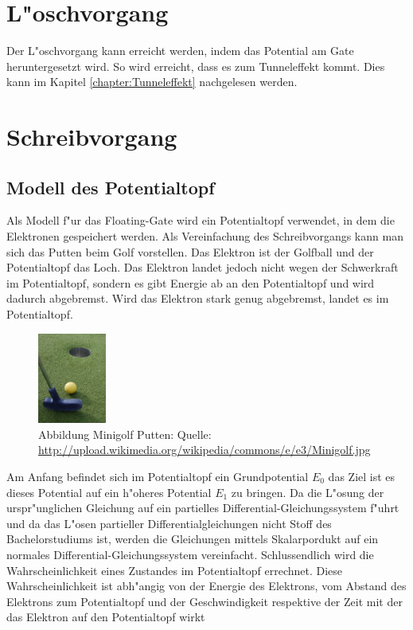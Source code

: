\begin{refsection}
\section{L"oschvorgang}
Der L"oschvorgang kann erreicht werden, indem das Potential am Gate
heruntergesetzt wird. So wird erreicht, dass es zum Tunneleffekt
kommt. Dies kann im Kapitel \ref{chapter:Tunneleffekt} nachgelesen werden.


\section{Schreibvorgang}

\subsection{Modell des Potentialtopf}
Als Modell f"ur das Floating-Gate wird ein Potentialtopf verwendet,
in dem die Elektronen gespeichert werden.
Als Vereinfachung des Schreibvorgangs kann man sich das Putten beim
Golf vorstellen. Das Elektron ist der Golfball und der Potentialtopf
das Loch. Das Elektron landet jedoch nicht wegen der Schwerkraft im
Potentialtopf, sondern es gibt Energie ab an den Potentialtopf und wird
dadurch abgebremst. Wird das Elektron stark genug abgebremst, landet es
im Potentialtopf.

\begin{figure}
\centering
\includegraphics[width=0.2\textwidth]{flash/graphics/Minigolf.jpg}
\caption{Abbildung Minigolf Putten: Quelle:
\url{http://upload.wikimedia.org/wikipedia/commons/e/e3/Minigolf.jpg}
\label{skript:Minigolf}}
\end{figure}

Am Anfang befindet sich im Potentialtopf ein Grundpotential $E_{0}$
das Ziel ist es dieses Potential auf ein h"oheres Potential $E_{1}$
zu bringen. Da die L"osung der urspr"unglichen Gleichung auf ein
partielles Differential-Gleichungssystem f"uhrt und da das L"osen
partieller Differentialgleichungen nicht Stoff des Bachelorstudiums
ist, werden die Gleichungen mittels Skalarpordukt auf ein normales
Differential-Gleichungssystem vereinfacht. Schlussendlich wird die
Wahrscheinlichkeit eines Zustandes im Potentialtopf errechnet. Diese
Wahrscheinlichkeit ist abh"angig von der Energie des Elektrons, vom
Abstand des Elektrons zum Potentialtopf und der Geschwindigkeit respektive
der Zeit mit der das Elektron auf den Potentialtopf wirkt


\end{refsection}
